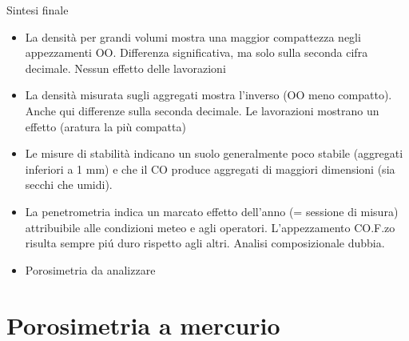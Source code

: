 \documentclass[10pt]{beamer}
\begin{document}

\begin{frame}{Sintesi finale}
  \begin{itemize}[<+->]
  \item La densit\`a per grandi volumi mostra una maggior compattezza
    negli appezzamenti OO. Differenza significativa, ma solo sulla
    seconda cifra decimale. Nessun effetto delle lavorazioni
  \item La densit\`a misurata sugli aggregati mostra l'inverso (OO
    meno compatto). Anche qui differenze sulla seconda decimale. Le
    lavorazioni mostrano un effetto (aratura la pi\`u compatta)
  \item Le misure di stabilit\`a indicano un suolo generalmente poco
    stabile (aggregati inferiori a 1 mm) e che il CO produce aggregati
    di maggiori dimensioni (sia secchi che umidi).
  \item La penetrometria indica un marcato effetto dell'anno (=
    sessione di misura) attribuibile alle condizioni meteo e agli
    operatori. L'appezzamento CO.F.zo risulta sempre pi\'u duro
    rispetto agli altri. Analisi composizionale dubbia.
  \item Porosimetria da analizzare
  \end{itemize}

\end{frame}
 \section{Porosimetria a mercurio}

\begin{frame}
\end{frame}

\appendix
\end{document}
